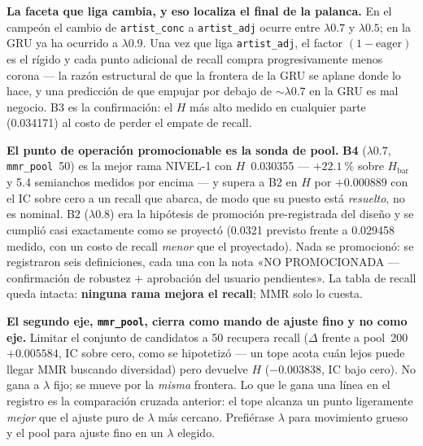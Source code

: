 \documentclass[11pt]{article}
\begin{document}
\textbf{La faceta que liga cambia, y eso localiza el final de la palanca.} En el
campeón el cambio de \texttt{artist\_conc} a \texttt{artist\_adj} ocurre entre
$\lambda\num{0.7}$ y $\lambda\num{0.5}$; en la GRU ya ha ocurrido a
$\lambda\num{0.9}$. Una vez que liga \texttt{artist\_adj}, el factor
$(1-\text{eager})$ es el rígido y cada punto adicional de recall compra
progresivamente menos corona --- la razón estructural de que la frontera de la GRU
se aplane donde lo hace, y una predicción de que empujar por debajo de
${\sim}\lambda\num{0.7}$ en la GRU es mal negocio. B3 es la confirmación: el $H$
más alto medido en cualquier parte (\num{0.034171}) al costo de perder el empate
de recall.

\textbf{El punto de operación promocionable es la sonda de pool.} \textbf{B4}
($\lambda\num{0.7}$, \texttt{mmr\_pool}~\num{50}) es la mejor rama NIVEL-1 con
$H$~\num{0.030355} --- $+\SI{22.1}{\percent}$ sobre $H_{\mathrm{bar}}$ y
\num{5.4} semianchos medidos por encima --- y supera a B2 en $H$ por
$+\num{0.000889}$ con el IC sobre cero a un recall que abarca, de modo que su
puesto está \emph{resuelto}, no es nominal. B2 ($\lambda\num{0.8}$) era la
hipótesis de promoción pre-registrada del diseño y se cumplió casi exactamente
como se proyectó (\num{0.0321} previsto frente a \num{0.029458} medido, con un
costo de recall \emph{menor} que el proyectado). Nada se promocionó: se
registraron seis definiciones, cada una con la nota «NO PROMOCIONADA ---
confirmación de robustez $+$ aprobación del usuario pendientes». La tabla de
recall queda intacta: \textbf{ninguna rama mejora el recall}; MMR solo lo cuesta.

\textbf{El segundo eje, \texttt{mmr\_pool}, cierra como mando de ajuste fino y no
como eje.} Limitar el conjunto de candidatos a \num{50} recupera recall
($\Delta$ frente a pool~\num{200} $+\num{0.005584}$, IC sobre cero, como se
hipotetizó --- un tope acota cuán lejos puede llegar MMR buscando diversidad) pero
devuelve $H$ ($-\num{0.003838}$, IC bajo cero). No gana a $\lambda$ fijo; se mueve
por la \emph{misma} frontera. Lo que le gana una línea en el registro es la
comparación cruzada anterior: el tope alcanza un punto ligeramente \emph{mejor}
que el ajuste puro de $\lambda$ más cercano. Prefiérase $\lambda$ para movimiento
grueso y el pool para ajuste fino en un $\lambda$ elegido.
\end{document}
